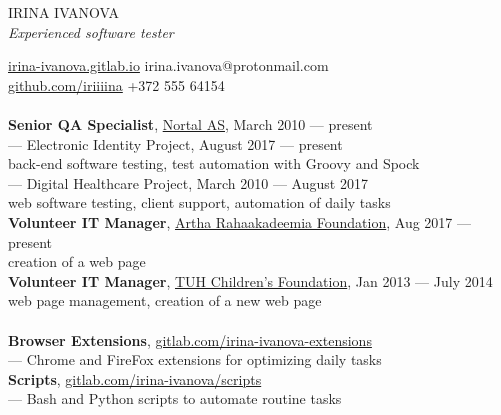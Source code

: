 \documentclass[a4paper, 12pt]{article}
\begin{document}
\begin{center}
  {\LARGE{IRINA IVANOVA}}\\
  \textit{Experienced software tester}
\end{center}
\href{https://irina-ivanova.gitlab.io}{irina-ivanova.gitlab.io}
\hspace{4.5cm}
irina.ivanova@protonmail.com\\
\href{https://github.com/iriiiina}{github.com/iriiiina}
\hspace{5cm}
+372 555 64154\\

\\
\textbf{Senior QA Specialist}, \href{https://nortal.com}{Nortal AS}, {\footnotesize{March 2010 --- present}}\\
\indent --- Electronic Identity Project, {\footnotesize{August 2017 --- present}}\\
\indent \indent \indent back-end software testing, test automation with Groovy and Spock\\
\indent --- Digital Healthcare Project, {\footnotesize{March 2010 --- August 2017}}\\
\indent \indent \indent web software testing, client support, automation of daily tasks\\
\textbf{Volunteer IT Manager}, \href{https://rahaakadeemia.ee}{Artha Rahaakadeemia Foundation}, {\footnotesize{Aug 2017 --- present}}\\
\indent \indent \indent creation of a web page\\
\textbf{Volunteer IT Manager}, \href{https://www.lastefond.ee}{TUH Children's Foundation}, {\footnotesize{Jan 2013 --- July 2014}}\\
\indent \indent \indent web page management, creation of a new web page\\

\\
\textbf{Browser Extensions}, \href{https://gitlab.com/irina-ivanova-extensions}{gitlab.com/irina-ivanova-extensions}\\
\indent --- Chrome and FireFox extensions for optimizing daily tasks\\
\textbf{Scripts}, \href{https://gitlab.com/irina-ivanova/scripts}{gitlab.com/irina-ivanova/scripts}\\
\indent --- Bash and Python scripts to automate routine tasks\\
\end{document}
